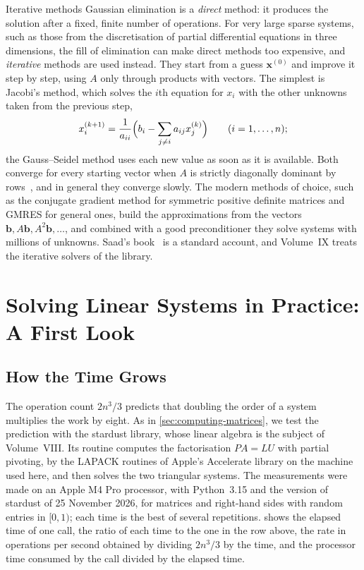 \begin{note}{Iterative methods}
Gaussian elimination is a \emph{direct} method: it produces the solution after a fixed, finite number of operations. For very large sparse systems, such as those from the discretisation of partial differential equations in three dimensions, the fill of elimination can make direct methods too expensive, and \emph{iterative} methods are used instead. They start from a guess $\mathbf x^{(0)}$ and improve it step by step, using $A$ only through products with vectors. The simplest is Jacobi's method, which solves the $i$th equation for $x_i$ with the other unknowns taken from the previous step,
\[
x_i^{(k+1)}=\frac1{a_{ii}}\Bigl(b_i-\sum_{j\ne i}a_{ij}x_j^{(k)}\Bigr)\qquad(i=1,\ldots,n);
\]
the Gauss--Seidel method uses each new value as soon as it is available. Both converge for every starting vector when $A$ is strictly diagonally dominant by rows~\cite[Sect.~11.2]{golub2013}, and in general they converge slowly. The modern methods of choice, such as the conjugate gradient method for symmetric positive definite matrices and GMRES for general ones, build the approximations from the vectors $\mathbf b,A\mathbf b,A^2\mathbf b,\ldots$, and combined with a good preconditioner they solve systems with millions of unknowns. Saad's book~\cite{saad2003} is a standard account, and Volume~IX treats the iterative solvers of the library.
\end{note}
\section{Solving Linear Systems in Practice: A First Look}
\label{sec:systems-practice}

\subsection{How the Time Grows}

The operation count $2n^3/3$ predicts that doubling the order of a system multiplies the work by eight. As in \cref{sec:computing-matrices}, we test the prediction with the stardust library, whose linear algebra is the subject of Volume~VIII. Its routine  computes the factorisation $PA=LU$ with partial pivoting, by the LAPACK routines of Apple's Accelerate library on the machine used here, and then solves the two triangular systems. The measurements were made on an Apple M4 Pro processor, with Python~3.15 and the version of stardust of 25 November 2026, for matrices and right-hand sides with random entries in $[0,1)$; each time is the best of several repetitions.  shows the elapsed time of one call, the ratio of each time to the one in the row above, the rate in operations per second obtained by dividing $2n^3/3$ by the time, and the processor time consumed by the call divided by the elapsed time.


